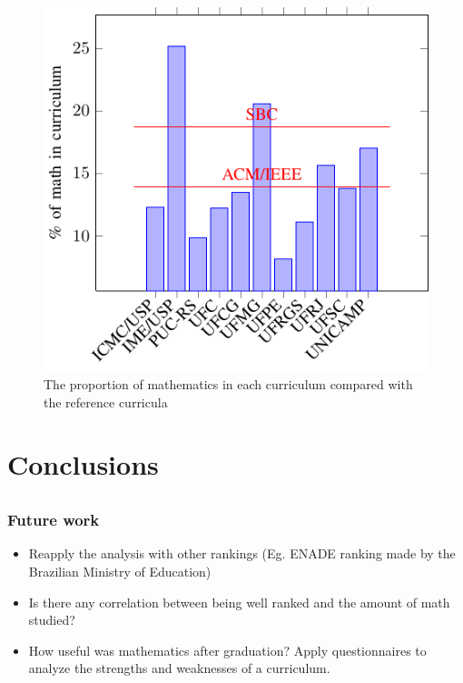 \documentclass{beamer}
\begin{document}
\begin{frame}
\begin{figure}[!t]
\centering
\includegraphics{../chart_math.pdf}
\caption{The proportion of mathematics in each curriculum compared with the reference curricula}
\label{chart_math}
\end{figure}

\end{frame}


\section{Conclusions}
\subsection{}

\begin{frame}
\frametitle{Future work}
\begin{itemize}
	\item Reapply the analysis with other rankings (Eg. ENADE ranking made
	by the Brazilian Ministry of Education)
	\item Is there any correlation between being well ranked and the amount of
	math studied?
	\item How useful was mathematics after graduation? Apply questionnaires to
	analyze the strengths and weaknesses of a curriculum.
\end{itemize}
\end{frame}
\end{document}
